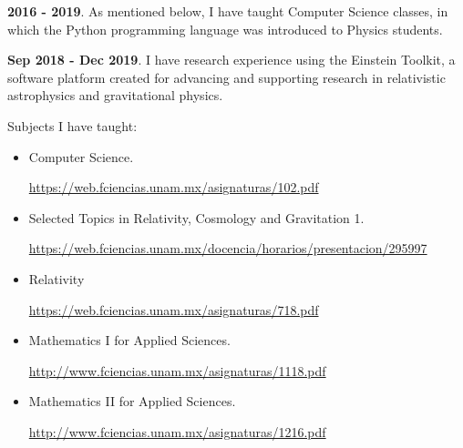 \documentclass[a4paper,10pt]{article} %
\begin{document}
\textbf{2016 - 2019}. As mentioned below, I have taught Computer Science classes, in which the Python programming language was introduced to Physics students.

\textbf{Sep 2018 - Dec 2019}. I have research experience using the Einstein Toolkit, a software platform created for advancing and supporting research in relativistic astrophysics and gravitational physics.

Subjects I have taught:
\begin{itemize}
	\item Computer Science.
	
	\href{https://web.fciencias.unam.mx/asignaturas/102.pdf}{https://web.fciencias.unam.mx/asignaturas/102.pdf}
	
	\item Selected Topics in Relativity, Cosmology and Gravitation 1.
	
	\href{https://web.fciencias.unam.mx/docencia/horarios/presentacion/295997}{https://web.fciencias.unam.mx/docencia/horarios/presentacion/295997}
	
	\item Relativity
	
	\href{https://web.fciencias.unam.mx/asignaturas/718.pdf}{https://web.fciencias.unam.mx/asignaturas/718.pdf}
	
	\item Mathematics I for Applied Sciences. 
	
	\href{http://www.fciencias.unam.mx/asignaturas/1118.pdf}{http://www.fciencias.unam.mx/asignaturas/1118.pdf}
	
	\item Mathematics II for Applied Sciences.
	
	\href{http://www.fciencias.unam.mx/asignaturas/1216.pdf}{http://www.fciencias.unam.mx/asignaturas/1216.pdf}
\end{itemize}
\vspace{0.4cm}
\end{document}
